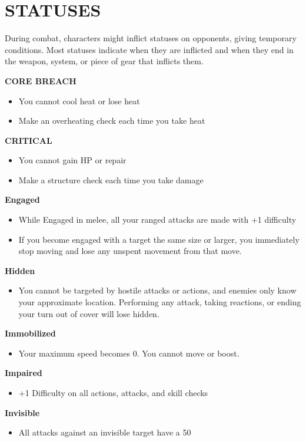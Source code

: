 \section{STATUSES}
During combat, characters might inflict statuses on opponents, giving temporary conditions. Most statuses indicate when they are inflicted and when they end in the weapon, system, or piece of gear that inflicts them.

\textbf{CORE BREACH}
\begin{itemize}
	\item You cannot cool heat or lose heat
	\item Make an overheating check each time you take heat
\end{itemize}

\textbf{CRITICAL}
\begin{itemize}
	\item You cannot gain HP or repair
	\item Make a structure check each time you take damage
\end{itemize}

\textbf{Engaged}
\begin{itemize}
	\item While Engaged in melee, all your ranged attacks are made with +1 difficulty
	\item If you become engaged with a target the same size or larger, you immediately stop moving and lose any unspent movement from that move.
\end{itemize}

\textbf{Hidden}
\begin{itemize}
	\item You cannot be targeted by hostile attacks or actions, and enemies only know your approximate location. Performing any attack, taking reactions, or ending your turn out of cover will lose hidden.
\end{itemize}

\textbf{Immobilized}
\begin{itemize}
	\item Your maximum speed becomes 0. You cannot move or boost.
\end{itemize}

\textbf{Impaired}
\begin{itemize}
	\item +1 Difficulty on all actions, attacks, and skill checks
\end{itemize}

\textbf{Invisible}
\begin{itemize}
	\item All attacks against an invisible target have a 50%
\end{itemize}

